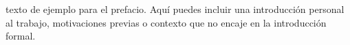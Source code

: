 texto de ejemplo para el prefacio. Aquí puedes incluir una introducción personal al trabajo, motivaciones previas o contexto que no encaje en la introducción formal.
